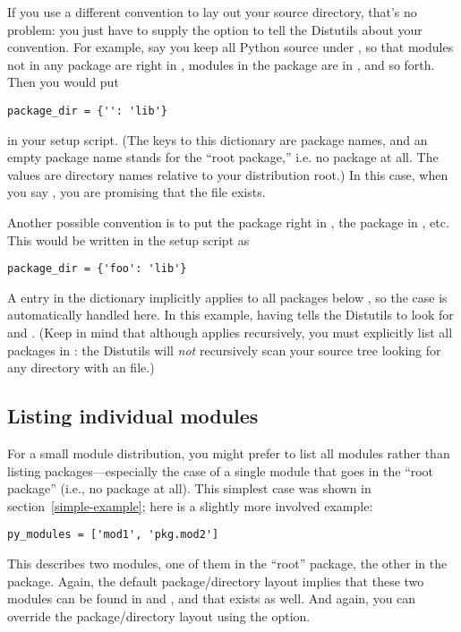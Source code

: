 \documentclass{howto}
\begin{document}
If you use a different convention to lay out your source directory,
that's no problem: you just have to supply the 
option to tell the Distutils about your convention.  For example, say
you keep all Python source under , so that modules not in any
package are right in , modules in the  package
are in , and so forth.  Then you would put
\begin{verbatim}
package_dir = {'': 'lib'}
\end{verbatim}
in your setup script.  (The keys to this dictionary are package names,
and an empty package name stands for the ``root package,'' i.e. no
package at all.  The values are directory names relative to your
distribution root.)  In this case, when you say
, you are promising that the file
 exists.

Another possible convention is to put the  package right in 
, the  package in , etc.  This
would be written in the setup script as
\begin{verbatim}
package_dir = {'foo': 'lib'}
\end{verbatim}
A  entry in the 
dictionary implicitly applies to all packages below , so
the  case is automatically handled here.  In this
example, having  tells the Distutils
to look for  and
.  (Keep in mind that although
 applies recursively, you must explicitly list all
packages in : the Distutils will \emph{not} recursively
scan your source tree looking for any directory with an
 file.)


\subsection{Listing individual modules}
\label{listing-modules}

For a small module distribution, you might prefer to list all modules
rather than listing packages---especially the case of a single module
that goes in the ``root package'' (i.e., no package at all).  This
simplest case was shown in section~\ref{simple-example}; here is a
slightly more involved example:
\begin{verbatim}
py_modules = ['mod1', 'pkg.mod2']
\end{verbatim}
This describes two modules, one of them in the ``root'' package, the
other in the  package.  Again, the default package/directory
layout implies that these two modules can be found in  and
, and that  exists as well.
And again, you can override the package/directory layout using the
 option.
\end{document}
